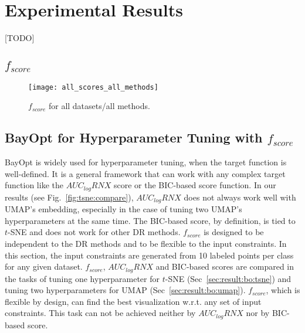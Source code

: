 \section{Experimental Results}\label{sec:results}

[TODO]

\subsection{$f_{score}$}\label{sec:result:fscore}
\begin{figure*}
    \centering
    \texttt{[image: all\_scores\_all\_methods]}
    \caption{$f_{score}$ for all datasets/all methods.}
    \label{fig:fscore:all}
\end{figure*}

\subsection{BayOpt for Hyperparameter Tuning with $f_{score}$}\label{sec:result:bo}
BayOpt is widely used for hyperparameter tuning, when the target function is well-defined.
It is a general framework that can work with any complex target function like the $AUC_{log}RNX$ score or the BIC-based score function.
In our results (see Fig.~\ref{fig:tsne:compare}), $AUC_{log}RNX$ does not always work well with UMAP's embedding, especially in the case of tuning two UMAP's hyperparameters at the same time.
The BIC-based score, by definition, is tied to $t$-SNE and does not work for other DR methods.
$f_{score}$ is designed to be independent to the DR methods and to be flexible to the input constraints.
In this section, the input constraints are generated from 10 labeled points per class for any given dataset.
$f_{score}$, $AUC_{log}RNX$ and BIC-based scores are compared in the tasks of tuning one hyperparameter for $t$-SNE (Sec~\ref{sec:result:bo:tsne}) and tuning two hyperparameters for UMAP (Sec~\ref{sec:result:bo:umap}).
$f_{score}$, which is flexible by design, can find the best visualization w.r.t. any set of input constraints.
This task can not be achieved neither by $AUC_{log}RNX$ nor by BIC-based score.

